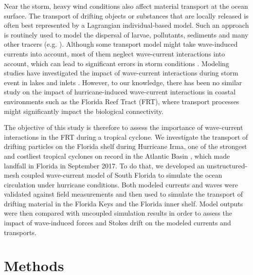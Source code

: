 \documentclass[preprint,12pt,authoryear]{elsarticle}
\begin{document}
Near the storm, heavy wind conditions also affect material transport at the ocean surface. The transport of drifting objects or substances that are locally released is often best represented by a Lagrangian individual-based model. Such an approach is routinely used to model the dispersal of larvae, pollutants, sediments and many other tracers (e.g. \citealp{le2012surface,liubartseva2018tracking, figueiredo2013synthesizing,frys2020fine}). Although some transport model might take wave-induced currents into account, most of them neglect wave-current interactions into account, which can lead to significant errors in storm conditions \citep{rohrs2012observation,curcic2016hurricane}. Modeling studies have investigated the impact of wave-current interactions during storm event in lakes and inlets \citep{niu2017role,mao2018wave,mao2020particle}. However, to our knowledge, there has been no similar study on the impact of hurricane-induced wave-current interactions in coastal environments such as the Florida Reef Tract (FRT), where transport processes might significantly impact the biological connectivity.

The objective of this study is therefore to assess the importance of wave-current interactions in the FRT during a tropical cyclone. We investigate the transport of drifting particles on the Florida shelf during Hurricane Irma, one of the strongest and costliest tropical cyclones on record in the Atlantic Basin \citep{xian2018brief}, which made landfall in Florida in September 2017. To do that, we developed an unstructured-mesh coupled wave-current model of South Florida to simulate the ocean circulation under hurricane conditions. Both modeled currents and waves were validated against field measurements and then used to simulate the transport of drifting material in the Florida Keys and the Florida inner shelf. Model outputs were then compared with uncoupled simulation results in order to assess the impact of wave-induced forces and Stokes drift on the modeled currents and transports.  

\section{Methods}
\end{document}
